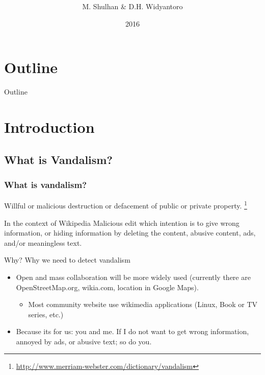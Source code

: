 \documentclass[english]{beamer}
\title[Detecting Vandalism with CRF]{%
	\mytitle
}
\author{M. Shulhan \& D.H. Widyantoro}
\institute[STEI-ITB]{%
	\mydept\\
	\itb
}
\date{2016}
\begin{document}
\frame{\titlepage}

\section*{Outline}
\begin{frame}
	{Outline}
	\begin{multicols}{2}
		\tableofcontents
	\end{multicols}
\end{frame}

\section{Introduction}

\subsection{What is Vandalism?}
\begin{frame}
	\frametitle{What is vandalism?}
	\begin{definition}
		Willful or malicious destruction or defacement of public or private
		property.
		\footnote{\url{http://www.merriam-webster.com/dictionary/vandalism}}
	\end{definition}
	\pause
	\begin{block}{In the context of Wikipedia}
		Malicious edit which intention is to give wrong information, or hiding
		information by deleting the content, abusive content, ads, and/or
		meaningless text.
	\end{block}
\end{frame}

\begin{frame}
	{Why?}
	{Why we need to detect vandalism}
	\begin{itemize}
	\item Open and mass collaboration will be more widely used (currently there
	are OpenStreetMap.org, wikia.com, location in Google Maps).
		\begin{itemize}
			\item Most community website use wikimedia applications (Linux, Book
			or TV series, etc.)
		\end{itemize}

	\item Because its for us: you and me. If I do not want to get wrong
	information, annoyed by ads, or abusive text; so do you.

	\end{itemize}
\end{frame}
\end{document}
